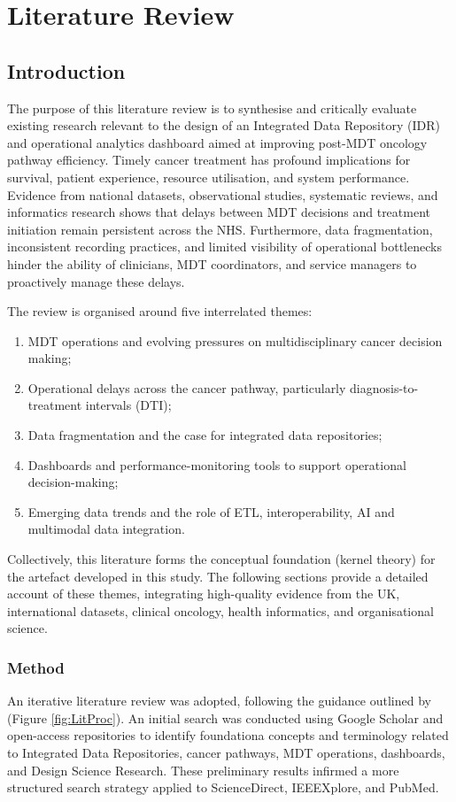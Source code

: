 \chapter{Literature Review}

\section{Introduction}

The purpose of this literature review is to synthesise and critically evaluate existing research relevant to the design of an Integrated Data Repository (IDR) and operational analytics dashboard aimed at improving post-MDT oncology pathway efficiency. Timely cancer treatment has profound implications for survival, patient experience, resource utilisation, and system performance. Evidence from national datasets, observational studies, systematic reviews, and informatics research shows that delays between MDT decisions and treatment initiation remain persistent across the NHS. Furthermore, data fragmentation, inconsistent recording practices, and limited visibility of operational bottlenecks hinder the ability of clinicians, MDT coordinators, and service managers to proactively manage these delays.

The review is organised around five interrelated themes:
\begin{enumerate}
    \item MDT operations and evolving pressures on multidisciplinary cancer decision making;
    \item Operational delays across the cancer pathway, particularly diagnosis-to-treatment intervals (DTI);
    \item Data fragmentation and the case for integrated data repositories;
    \item Dashboards and performance-monitoring tools to support operational decision-making;
    \item Emerging data trends and the role of ETL, interoperability, AI and multimodal data integration.
\end{enumerate}

Collectively, this literature forms the conceptual foundation (kernel theory) for the artefact developed in this study. The following sections provide a detailed account of these themes, integrating high-quality evidence from the UK, international datasets, clinical oncology, health informatics, and organisational science.

\subsection{Method}
An iterative literature review was adopted, following the guidance outlined by  \cite{dawson2015} (Figure \ref{fig:LitProc}). An initial search was conducted using Google Scholar and open-access repositories to identify foundationa concepts and terminology related to Integrated Data Repositories, cancer pathways, MDT operations, dashboards, and Design Science Research. These preliminary results infirmed a more structured search strategy applied to ScienceDirect, IEEEXplore, and PubMed.

